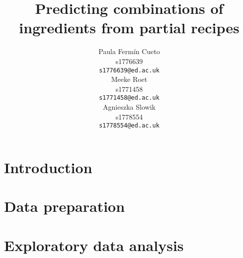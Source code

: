 \documentclass{article}
\title{Predicting combinations of ingredients from partial recipes}
\author{
  Paula Ferm\'in Cueto\\
  s1776639\\
  \texttt{s1776639@ed.ac.uk} \\
  \And
  Meeke Roet\\
  s1771458\\
  \texttt{s1771458@ed.ac.uk} \\
 \And
  Agnieszka Slowik\\
  s1778554\\
  \texttt{s1778554@ed.ac.uk} \\
}
\begin{document}
\maketitle

\begin{abstract}
 \blindtext[1]
\end{abstract}






\section{Introduction}






\section{Data preparation}


\section{Exploratory data analysis}

\end{document}
